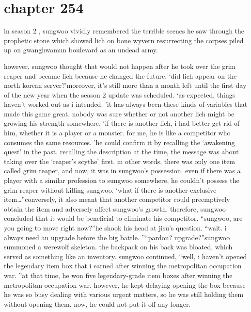 \section{chapter 254}

                            in season 2 , sungwoo vividly remembered the terrible scenes he saw through the prophetic stone which showed lich on bone wyvern resurrecting the corpses piled up on gwanghwamun boulevard as an undead army.





however, sungwoo thought that would not happen after he took over the grim reaper and became lich because he changed the future.
‘did lich appear on the north korean server?’moreover, it’s still more than a month left until the first day of the new year when the season 2 update was scheduled.
‘as expected, things haven’t worked out as i intended.
’it has always been these kinds of variables that made this game great.
 nobody was sure whether or not another lich might be growing his strength somewhere.
‘if there is another lich, i had better get rid of him, whether it is a player or a monster.
 for me, he is like a competitor who consumes the same resources.
’he could confirm it by recalling the ‘awakening quest’ in the past.
recalling the description at the time, the message was about taking over the ‘reaper’s scythe’ first.
 in other words, there was only one item called grim reaper, and now, it was in sungwoo’s possession.
even if there was a player with a similar profession to sungwoo somewhere, he couldn’t possess the grim reaper without killing sungwoo.
‘what if there is another exclusive item…”conversely, it also meant that another competitor could preemptively obtain the item and adversely affect sungwoo’s growth.
therefore, sungwoo concluded that it would be beneficial to eliminate his competitor.
“sungwoo, are you going to move right now?”he shook his head at jisu’s question.
“wait.
 i always need an upgrade before the big battle.
”“pardon? upgrade?”sungwoo summoned a werewolf skeleton.
 the backpack on his back was bloated, which served as something like an inventory.
sungwoo continued, “well, i haven’t opened the legendary item box that i earned after winning the metropolitan occupation war.
”at that time, he won five legendary-grade item boxes after winning the metropolitan occupation war.
however, he kept delaying opening the box because he was so busy dealing with various urgent matters, so he was still holding them without opening them.
 now, he could not put it off any longer.

